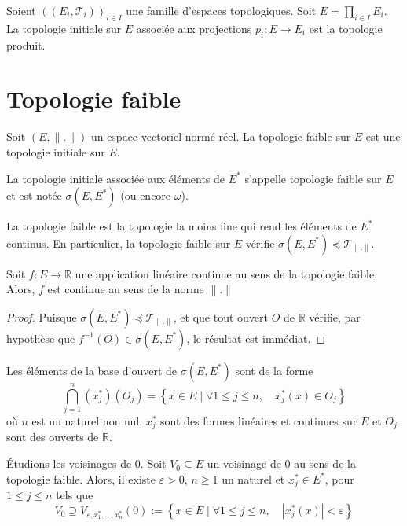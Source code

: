 \begin{ex}
  Soient $((E_i, \mathcal{T}_i))_{i\in I}$ une famille d'espaces topologiques.
  Soit $E = \prod_{i\in I} E_i$. La topologie initiale sur $E$ associée
  aux projections $p_i: E\to E_i$ est la topologie produit.
\end{ex}


\section{Topologie faible}
Soit $(E, \|.\|)$ un espace vectoriel normé réel. La topologie
faible sur $E$ est une topologie initiale sur $E$.
\begin{df}
  La topologie initiale associée aux éléments de $E^*$
  s'appelle topologie faible sur $E$ et est notée $\sigma(E, E^*)$
  (ou encore $\omega$).
\end{df}

La topologie faible est la topologie la moins fine qui rend les
éléments de $E^*$ continus. En particulier, la topologie faible
sur $E$ vérifie $\sigma(E, E^*)\preceq \mathcal{T}_{\|.\|}$.

\begin{lem}
  Soit $f: E\to\mathbb R$ une application linéaire
  continue au sens de la topologie faible. Alors,
  $f$ est continue au sens de la norme $\|.\|$
\end{lem}

\begin{proof}
  Puisque $\sigma(E, E^*)\preceq \mathcal{T}_{\|.\|}$, et
  que tout ouvert $O$ de $\mathbb R$ vérifie, par
  hypothèse que $f^{-1}(O)\in\sigma(E, E^*)$, le
  résultat est immédiat.
\end{proof}

Les éléments de la base d'ouvert de $\sigma(E, E^*)$ sont de la forme
\begin{equation*}
  \bigcap_{j=1}^n (x_j^*)(O_j) =
  \left\{ x\in E\mid \forall 1\leq j\leq n,\quad x_j^*(x)\in O_j\right\}
\end{equation*}
où $n$ est un naturel non nul, $x_j^*$ sont des formes linéaires et continues
sur $E$ et $O_j$ sont des ouverts de $\mathbb R$.

\'{E}tudions les voisinages de $0$. Soit $V_0\subseteq E$ un voisinage
de $0$ au sens de la topologie faible. Alors, il existe $\varepsilon > 0$,
$n\geq 1$ un naturel et $x_j^*\in E^*$, pour $1\leq j\leq n$ tels que
\begin{equation*}
  V_0\supseteq V_{\varepsilon, x_1^*, \ldots, x_n^*}(0) :=
  \left\{ x\in E\mid \forall 1\leq j\leq n,\quad
    |x_j^*(x)| < \varepsilon\right\}
\end{equation*}


